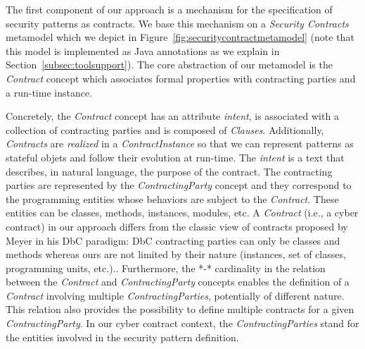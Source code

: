  The first component of our approach is a mechanism for the specification of security patterns as contracts. We base this mechanism on a \emph{Security Contracts} metamodel which we depict in Figure~\ref{fig:securitycontractmetamodel} (note that this model is implemented as Java annotations as we explain in Section~\ref{subsec:toolsupport}). The core abstraction of our metamodel is the \emph{Contract} concept which associates formal properties with contracting parties and a run-time instance. 

 
Concretely,  the \textit{Contract} concept has an attribute \textit{intent}, is associated with a collection of contracting parties and is composed of \textit{Clauses}. Additionally, \textit{Contracts} are \emph{realized} in a \emph{ContractInstance} so that we can represent patterns as stateful objets and follow their evolution at run-time. The \textit{intent} is a text that describes, in natural language, the purpose of the contract. The contracting parties are represented by the \textit{ContractingParty} concept and they correspond to the programming entities whose behaviors are subject to the \textit{Contract}. These entities can be classes, methods, instances, modules, etc. A \textit{Contract}  (i.e., a cyber contract) in our approach differs from the classic view of contracts proposed by Meyer in his DbC paradigm: DbC contracting parties can only be classes and methods whereas ours are not limited by their nature (instances, set of classes, programming units, etc.).. Furthermore, the *-* cardinality in the relation between the \textit{Contract} and \textit{ContractingParty} concepts enables the definition of a \textit{Contract} involving multiple \textit{ContractingParties}, potentially of different nature. This relation also provides the possibility to define multiple contracts for a given \textit{ContractingParty}. In our cyber contract context, the \textit{ContractingParties} stand for the entities involved in the security pattern definition. 

